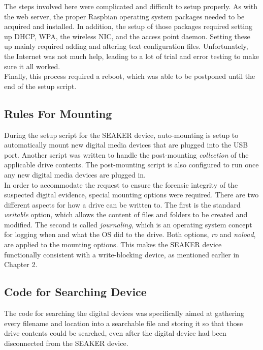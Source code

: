 \documentclass[12pt]{article}
\begin{document}
The steps involved here were complicated and difficult to setup properly.  As
with the web server, the proper Raspbian operating system packages needed to be
acquired and installed.  In addition, the setup of those packages required 
setting up DHCP, WPA, the wireless NIC, and the access point daemon.  Setting
these up mainly required adding and altering text configuration files.  
Unfortunately, the Internet was not much help, leading to a lot of trial and 
error testing to make sure it all worked.\\

Finally, this process required a reboot, which was able to be postponed until
the end of the setup script.\\

\subsection{Rules For Mounting}

During the setup script for the SEAKER device, auto-mounting is setup to
automatically mount new digital media devices that are plugged into the USB
port.  Another script was written to handle the post-mounting {\em collection}
of the applicable drive contents.  The post-mounting script is also
configured to run once any new digital media devices are plugged in.\\

In order to accommodate the request to ensure the forensic integrity of the
suspected digital evidence, special mounting options were required.  There
are two different aspects for how a drive can be written to.  The first is
the standard {\em writable} option, which allows the content of files and
folders to be created and modified.  The second is called {\em journaling},
which is an operating system concept for logging when and what the OS 
did to the drive.  Both options, {\em ro} and {\em noload}, are applied to
the mounting options.  This makes the SEAKER device functionally consistent
with a write-blocking device, as mentioned earlier in Chapter 2.\\

\subsection{Code for Searching Device}

The code for searching the digital devices was specifically aimed at gathering
every filename and location into a searchable file and storing it so that
those drive contents could be searched, even after the digital device had been
disconnected from the SEAKER device.\\
\end{document}
